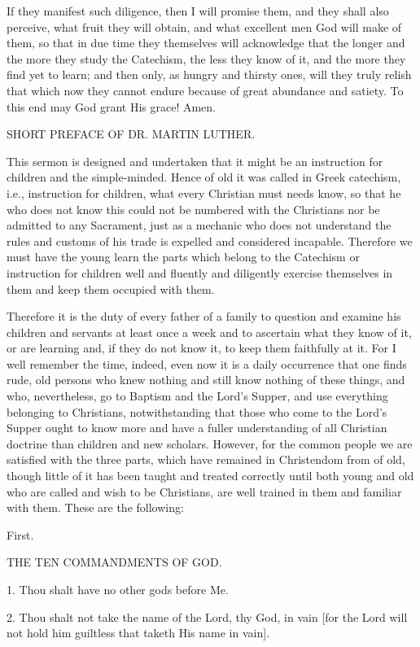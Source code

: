 If they manifest such diligence, then I will promise them, and they
shall also perceive, what fruit they will obtain, and what excellent
men God will make of them, so that in due time they themselves will
acknowledge that the longer and the more they study the Catechism, the
less they know of it, and the more they find yet to learn; and then
only, as hungry and thirsty ones, will they truly relish that which now
they cannot endure because of great abundance and satiety. To this end
may God grant His grace! Amen.


 SHORT PREFACE OF DR. MARTIN LUTHER.


This sermon is designed and undertaken that it might be an instruction
for children and the simple-minded. Hence of old it was called in Greek
catechism, i.e., instruction for children, what every Christian must
needs know, so that he who does not know this could not be numbered
with the Christians nor be admitted to any Sacrament, just as a
mechanic who does not understand the rules and customs of his trade is
expelled and considered incapable. Therefore we must have the young
learn the parts which belong to the Catechism or instruction for
children well and fluently and diligently exercise themselves in them
and keep them occupied with them.

Therefore it is the duty of every father of a family to question and
examine his children and servants at least once a week and to
ascertain what they know of it, or are learning and, if they do not
know it, to keep them faithfully at it. For I well remember the time,
indeed, even now it is a daily occurrence that one finds rude, old
persons who knew nothing and still know nothing of these things, and
who, nevertheless, go to Baptism and the Lord's Supper, and use
everything belonging to Christians, notwithstanding that those who come
to the Lord's Supper ought to know more and have a fuller understanding
of all Christian doctrine than children and new scholars. However, for
the common people we are satisfied with the three parts, which have
remained in Christendom from of old, though little of it has been
taught and treated correctly until both young and old who are called
and wish to be Christians, are well trained in them and familiar with
them. These are the following:


First.

THE TEN COMMANDMENTS OF GOD.


1. Thou shalt have no other gods before Me.

2. Thou shalt not take the name of the Lord, thy God, in vain [for the
Lord will not hold him guiltless that taketh His name in vain].

